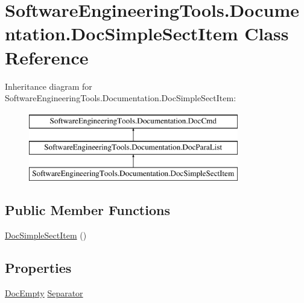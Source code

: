 \hypertarget{class_software_engineering_tools_1_1_documentation_1_1_doc_simple_sect_item}{\section{Software\+Engineering\+Tools.\+Documentation.\+Doc\+Simple\+Sect\+Item Class Reference}
\label{class_software_engineering_tools_1_1_documentation_1_1_doc_simple_sect_item}
}
Inheritance diagram for Software\+Engineering\+Tools.\+Documentation.\+Doc\+Simple\+Sect\+Item\+:\begin{figure}[H]
\begin{center}
\leavevmode
\includegraphics[height=3.000000cm]{class_software_engineering_tools_1_1_documentation_1_1_doc_simple_sect_item}
\end{center}
\end{figure}
\subsection*{Public Member Functions}
\begin{DoxyCompactItemize}
\item 
\hyperlink{class_software_engineering_tools_1_1_documentation_1_1_doc_simple_sect_item_a51b27f8b6bddfb9e1d74e3f74277adeb}{Doc\+Simple\+Sect\+Item} ()
\end{DoxyCompactItemize}
\subsection*{Properties}
\begin{DoxyCompactItemize}
\item 
\hyperlink{class_software_engineering_tools_1_1_documentation_1_1_doc_empty}{Doc\+Empty} \hyperlink{class_software_engineering_tools_1_1_documentation_1_1_doc_simple_sect_item_a04d97114512172cc8c9ac350582c8c22}{Separator}
\end{DoxyCompactItemize}


